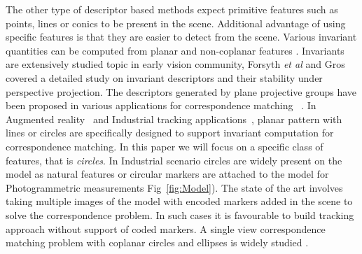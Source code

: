 \documentclass{bmvc2k}
\newcommand{\fref}[1]{Fig\bmvaOneDot~\ref{#1}}
\def\etal{\emph{et al}\bmvaOneDot}
\begin{document}
The other type of descriptor based methods expect primitive features such as points, lines or conics to be present in the scene. 
Additional advantage of using specific features is that they are easier to detect from the scene. 
Various invariant quantities can be computed from planar and non-coplanar features \cite{forsyth_91}. 
Invariants are extensively studied topic in early vision community, Forsyth \etal \cite{forsyth_91} and Gros \cite{gros_projective_1992} covered a detailed study on invariant descriptors and their stability under perspective projection. 
The descriptors generated by plane projective groups have been proposed in various applications for correspondence matching ~\cite{Matsunaga2000,uchiyama_random_2011,ying_camera_2007}.
In Augmented reality~\cite{uchiyama_random_2011,van_rhijn_optical_2004} and Industrial tracking applications~\cite{AICON}, planar pattern with lines or circles are specifically designed to support invariant computation for correspondence matching.  
In this paper we will focus on a specific class of features, that is \textit{circles}. 
In Industrial scenario circles are widely present on the model as natural features or circular markers are attached to the model for Photogrammetric measurements \cite{luhmann_close_2006} \fref{fig:Model}).
The state of the art involves taking multiple images of the model with encoded markers added in the scene to solve the correspondence problem. 
In such cases it is favourable to build tracking approach without support of coded markers. 
A single view correspondence matching problem with coplanar circles and ellipses is widely studied \cite{lepetit_monocular_2005,forsyth_91,Ferri_1993}.
\end{document}
